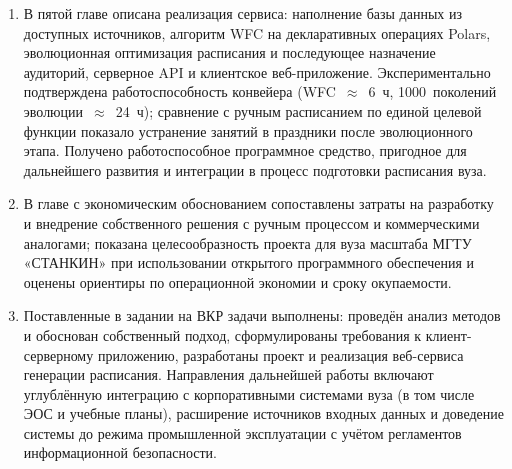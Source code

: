 \begin{enumerate} [nosep, left = 0pt]
	\item В пятой главе описана реализация сервиса: наполнение базы данных из доступных источников, алгоритм WFC на декларативных операциях Polars, эволюционная оптимизация расписания и последующее назначение аудиторий, серверное API и клиентское веб-приложение. Экспериментально подтверждена работоспособность конвейера (WFC~$\approx$~6~ч, 1000~поколений эволюции~$\approx$~24~ч); сравнение с ручным расписанием по единой целевой функции показало устранение занятий в праздники после эволюционного этапа. Получено работоспособное программное средство, пригодное для дальнейшего развития и интеграции в процесс подготовки расписания вуза.

	\item В главе с экономическим обоснованием сопоставлены затраты на разработку и внедрение собственного решения с ручным процессом и коммерческими аналогами; показана целесообразность проекта для вуза масштаба МГТУ «СТАНКИН» при использовании открытого программного обеспечения и оценены ориентиры по операционной экономии и сроку окупаемости.

	\item Поставленные в задании на ВКР задачи выполнены: проведён анализ методов и обоснован собственный подход, сформулированы требования к клиент-серверному приложению, разработаны проект и реализация веб-сервиса генерации расписания. Направления дальнейшей работы включают углублённую интеграцию с корпоративными системами вуза (в том числе ЭОС и учебные планы), расширение источников входных данных и доведение системы до режима промышленной эксплуатации с учётом регламентов информационной безопасности.
\end{enumerate}
